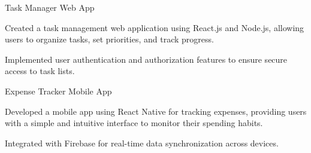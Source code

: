 
\begin{cventries}
  \cventry
    {} %
    { Task Manager Web App} %
    {} %
    {} %
    {
      \begin{cvitems} %
        \item {Created a task management web application using React.js and Node.js, allowing users to organize tasks, set priorities, and track progress.}
		    \item {Implemented user authentication and authorization features to ensure secure access to task lists.}
      \end{cvitems}
    }

  \cventry
    {} %
    {Expense Tracker Mobile App} %
    {} %
    {} %
    {
      \begin{cvitems} %
      	\item {Developed a mobile app using React Native for tracking expenses, providing users with a simple and intuitive interface to monitor their spending habits.}
		    \item {Integrated with Firebase for real-time data synchronization across devices.}
      \end{cvitems}
    }
\end{cventries}
    

